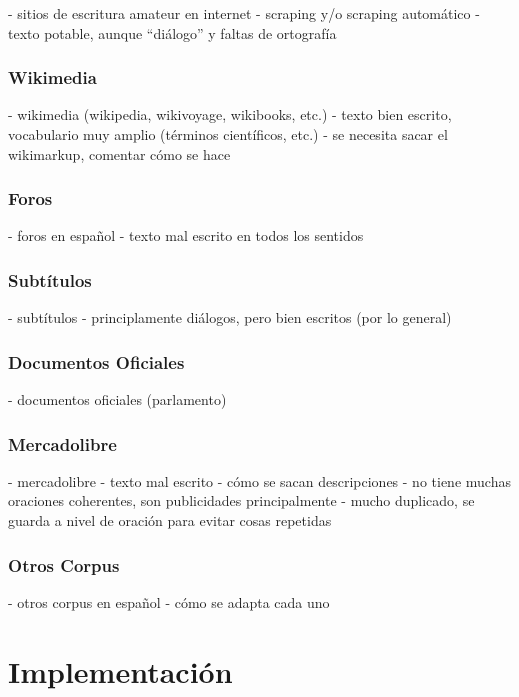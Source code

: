 - sitios de escritura amateur en internet
    - scraping y/o scraping automático
    - texto potable, aunque ``diálogo'' y faltas de ortografía


\subsubsection{Wikimedia}

- wikimedia (wikipedia, wikivoyage, wikibooks, etc.)
    - texto bien escrito, vocabulario muy amplio (términos científicos, etc.)
    - se necesita sacar el wikimarkup, comentar cómo se hace


\subsubsection{Foros}

- foros en español
    - texto mal escrito en todos los sentidos


\subsubsection{Subtítulos}

- subtítulos
    - principlamente diálogos, pero bien escritos (por lo general)


\subsubsection{Documentos Oficiales}

- documentos oficiales (parlamento)


\subsubsection{Mercadolibre}

- mercadolibre
    - texto mal escrito
    - cómo se sacan descripciones
    - no tiene muchas oraciones coherentes, son publicidades principalmente
    - mucho duplicado, se guarda a nivel de oración para evitar cosas repetidas


\subsubsection{Otros Corpus}

- otros corpus en español
    - cómo se adapta cada uno


\section{Implementación}

